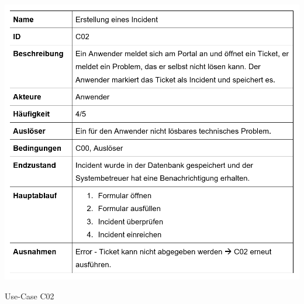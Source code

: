 \newpage
\vspace{-.5cm}	
\begin{table}[h]
	\centering
	\includegraphics[scale=0.6]{figures/C02.png}
	\caption{Use-Case C02}
	\label{Abb_C02}
\end{table}

